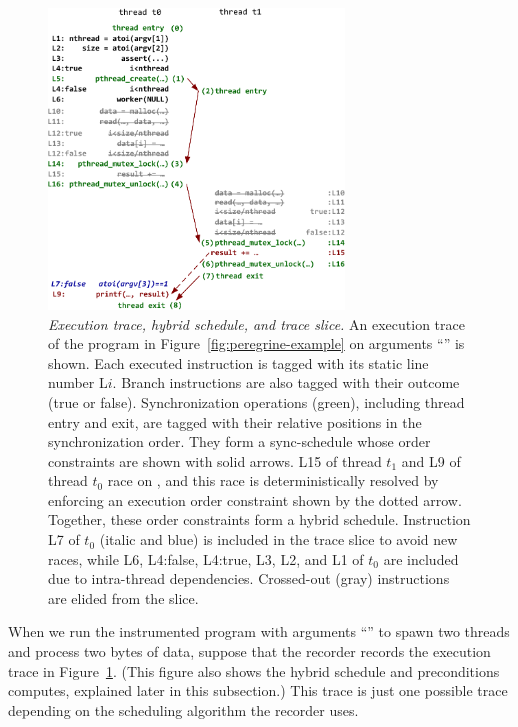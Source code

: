 \begin{figure}[!ht]
\begin{minipage}[t]{\columnwidth}
\centering
\includegraphics[width=0.7\textwidth]{peregrine/figures/trace}
\end{minipage}
\caption{{\em Execution trace, hybrid schedule, and trace slice.}  An
  execution trace of the program in Figure~\ref{fig:peregrine-example} on arguments
  ``'' is shown.  Each executed instruction is tagged
  with its static line number L$i$.  Branch instructions are also tagged
  with their outcome (true or false).  Synchronization operations (green),
  including thread entry and exit, are tagged
  with their relative positions in the synchronization order.  They form a
  sync-schedule whose order constraints are shown with solid arrows.  L15 of
  thread $t_1$ and L9 of thread $t_0$ race on , and this race is
  deterministically resolved by enforcing an execution order constraint
  shown by the dotted arrow.  Together, these order constraints form a hybrid
  schedule.  Instruction L7 of $t_0$ (italic and blue) is included in the
  trace slice to avoid new races, while L6, L4:false, L4:true, L3, L2, and
  L1 of $t_0$ are included due to intra-thread
  dependencies. Crossed-out (gray) instructions are elided from the
  slice.}\label{fig:peregrine-trace}
\end{figure}

When we run the instrumented program with arguments ``'' to spawn
two threads and process two bytes of data, suppose that the recorder records
the execution trace in Figure~\ref{fig:peregrine-trace}.  (This figure also shows
the hybrid schedule and preconditions \peregrine computes, explained
later in this subsection.)  This trace is just one
possible trace depending on the scheduling algorithm the recorder uses.

